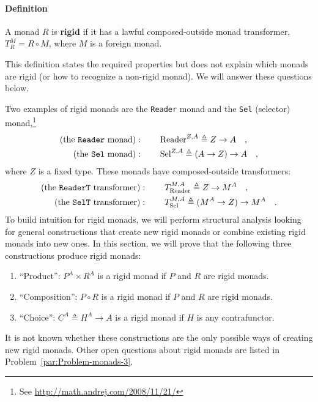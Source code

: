 \paragraph{Definition}

A monad $R$ is \textbf{rigid} if it has a lawful composed-outside
monad transformer, $T_{R}^{M}=R\circ M$, where $M$ is a foreign
monad. 

This definition states the required properties but does not explain
which monads are rigid (or how to recognize a non-rigid monad). We
will answer these questions below.

Two examples of rigid monads are the \lstinline!Reader! monad and
the \lstinline!Sel! (selector)
monad,\footnote{See \href{http://math.andrej.com/2008/11/21/}{http://math.andrej.com/2008/11/21/}}
\begin{align*}
\text{(the \texttt{Reader} monad)} & :\quad\quad\text{Reader}^{Z,A}\triangleq Z\rightarrow A\quad,\\
\text{(the \texttt{Sel} monad)} & :\quad\quad\text{Sel}^{Z,A}\triangleq\left(A\rightarrow Z\right)\rightarrow A\quad,
\end{align*}
where $Z$ is a fixed type. These monads have composed-outside transformers:
\begin{align*}
\text{(the \texttt{ReaderT} transformer)} & :\quad\quad T_{\text{Reader}}^{M,A}\triangleq Z\rightarrow M^{A}\quad,\\
\text{(the \texttt{SelT} transformer)} & :\quad\quad T_{\text{Sel}}^{M,A}\triangleq(M^{A}\rightarrow Z)\rightarrow M^{A}\quad.
\end{align*}
To build intuition for rigid monads, we will perform structural analysis
looking for general constructions that create new rigid monads or
combine existing rigid monads into new ones. In this section, we will
prove that the following three constructions produce rigid monads:
\begin{enumerate}
\item \textsf{``}Product\textsf{''}: $P^{A}\times R^{A}$ is a rigid monad if $P$ and $R$
are rigid monads.
\item \textsf{``}Composition\textsf{''}: $P\circ R$ is a rigid monad if $P$ and $R$ are
rigid monads.
\item \textsf{``}Choice\textsf{''}: $C^{A}\triangleq H^{A}\rightarrow A$ is a rigid monad
if $H$ is any contrafunctor.
\end{enumerate}
It is not known whether these constructions are the only possible
ways of creating new rigid monads. Other open questions about rigid
monads are listed in Problem~\ref{par:Problem-monads-3}.

